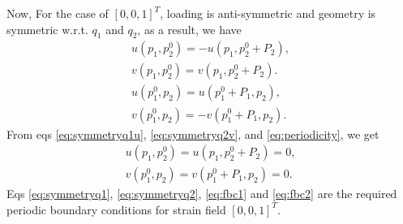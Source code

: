 \documentclass[10pt]{article}
\begin{document}
\par
Now, For the case of $[0, 0, 1]^T$, loading is anti-symmetric and geometry is symmetric w.r.t. $q_1$ and $q_2$, as a result, we have
\begin{eqnarray}
\label{eq:symmetryq1u}
u(p_1, p_2^0) = -u(p_1, p_2^0+P_2),\\
\label{eq:symmetryq1}
v(p_1, p_2^0) = v(p_1, p_2^0+P_2).\\
\label{eq:symmetryq2}
u(p_1^0, p_2) = u(p_1^0+P_1, p_2),\\
\label{eq:symmetryq2v}
v(p_1^0, p_2) = -v(p_1^0+P_1, p_2).
\end{eqnarray}
From eqs \eqref{eq:symmetryq1u}, \eqref{eq:symmetryq2v}, and \eqref{eq:periodicity}, we get
\begin{eqnarray}
\label{eq:fbc2}
u(p_1, p_2^0) = u(p_1, p_2^0+P_2) = 0,\\
\label{eq:fbc1}
v(p_1^0, p_2) = v(p_1^0+P_1, p_2) = 0.
\end{eqnarray}
Eqs \eqref{eq:symmetryq1}, \eqref{eq:symmetryq2}, \eqref{eq:fbc1} and 
\eqref{eq:fbc2} are the required periodic boundary conditions for strain field $[0, 0, 1]^T$.\par
\end{document}
